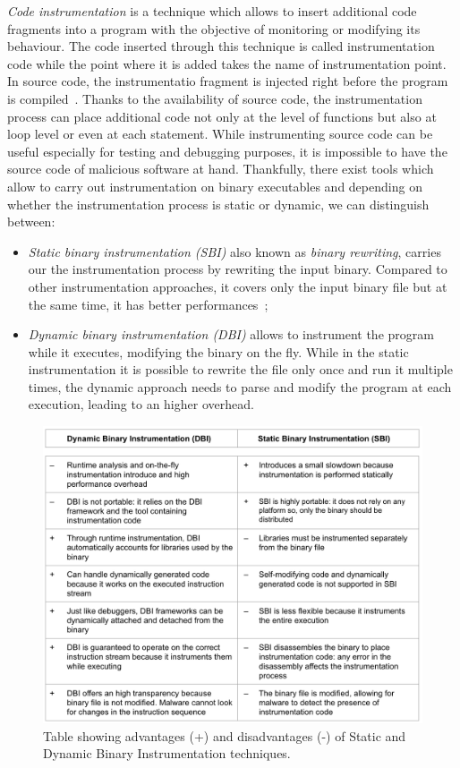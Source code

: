 \documentclass[LaM,binding=0.6cm]{sapthesis}
\begin{document}
\textit{Code instrumentation} is a technique which allows to insert additional code fragments into a program with the objective of monitoring or modifying its behaviour. The code inserted through this technique is called instrumentation code while the point where it is added takes the name of instrumentation point.\\
In source code, the instrumentatio fragment is injected right before the program is compiled~\cite{geimer2009generic}. Thanks to the availability of source code, the instrumentation process can place additional code not only at the level of functions but also at loop level or even at each statement. While instrumenting source code can be useful especially for testing and debugging purposes, it is impossible to have the source code of malicious software at hand. Thankfully, there exist tools which allow to carry out instrumentation on binary executables and depending on whether the instrumentation process is static or dynamic, we can distinguish between:
\begin{itemize}
\item \textit{Static binary instrumentation (SBI)} also known as \textit{binary rewriting}, carries our the instrumentation process by rewriting the input binary. Compared to other instrumentation approaches, it covers only the input binary file but at the same time, it has better performances~\cite{ermakov2017static};
\item \textit{Dynamic binary instrumentation (DBI)} allows to instrument the program while it executes, modifying the binary on the fly. While in the static instrumentation it is possible to rewrite the file only once and run it multiple times, the dynamic approach needs to parse and modify the program at each execution, leading to an higher overhead.
\end{itemize}

\begin{figure}[t]
\centering
\includegraphics[scale=.5]{images/techn6}
\caption{Table showing advantages (+) and disadvantages (-) of Static and Dynamic Binary Instrumentation techniques.}
\end{figure}
\end{document}
